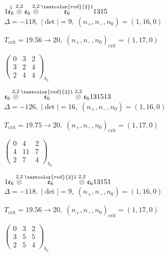 \documentclass[10pt]{article}
\begin{document}
$1\overset{1}{\mathfrak{e}_6}\overset{2,2}{\otimes}\mathfrak{e}_6\overset{2,2}{\otimes}\overset{\textcolor{red}{2}1}{\mathfrak{e}_6}1315$ \quad $\Delta=-118,\; |\det|=9,\; (n_+,n_-,n_0)=(1,16,0)$

\hspace{1em}$T_{\text{crit}}=19.56 \to 20,\; (n_+,n_-,n_0)_{\text{crit}}=(1,17,0)$

\hspace{2em}$\left(\begin{smallmatrix}0 & 3 & 2 \\ 3 & 2 & 4 \\ 2 & 4 & 4\end{smallmatrix}\right)_{\!b_0}$

\smallskip

$\mathfrak{e}_6\overset{2,2}{\otimes}\overset{\textcolor{red}{2}1}{\mathfrak{e}_6}\overset{2,2}{\otimes}\mathfrak{e}_6131513$ \quad $\Delta=-126,\; |\det|=16,\; (n_+,n_-,n_0)=(1,16,0)$

\hspace{1em}$T_{\text{crit}}=19.75 \to 20,\; (n_+,n_-,n_0)_{\text{crit}}=(1,17,0)$

\hspace{2em}$\left(\begin{smallmatrix}0 & 4 & 2 \\ 4 & 11 & 7 \\ 2 & 7 & 4\end{smallmatrix}\right)_{\!b_0}$

\smallskip

$1\mathfrak{e}_6\overset{2,2}{\otimes}\overset{\textcolor{red}{2}1}{\mathfrak{e}_6}\overset{2,2}{\otimes}\mathfrak{e}_613151$ \quad $\Delta=-118,\; |\det|=9,\; (n_+,n_-,n_0)=(1,16,0)$

\hspace{1em}$T_{\text{crit}}=19.56 \to 20,\; (n_+,n_-,n_0)_{\text{crit}}=(1,17,0)$

\hspace{2em}$\left(\begin{smallmatrix}0 & 3 & 2 \\ 3 & 5 & 5 \\ 2 & 5 & 4\end{smallmatrix}\right)_{\!b_0}$
\end{document}
